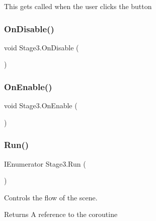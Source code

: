 This gets called when the user clicks the button 

\mbox{\label{class_stage3_a41463491a3a1b6640d0cc22a19de2dfa}} 
\subsubsection{\texorpdfstring{On\+Disable()}{OnDisable()}}
{\footnotesize\ttfamily void Stage3.\+On\+Disable (\begin{DoxyParamCaption}{ }\end{DoxyParamCaption})\hspace{0.3cm}{\ttfamily [private]}}

\mbox{\label{class_stage3_a52931a93bc0d482e2addeda6f41b7d6c}} 
\subsubsection{\texorpdfstring{On\+Enable()}{OnEnable()}}
{\footnotesize\ttfamily void Stage3.\+On\+Enable (\begin{DoxyParamCaption}{ }\end{DoxyParamCaption})\hspace{0.3cm}{\ttfamily [private]}}

\mbox{\label{class_stage3_a3ebce4adf62b36d8987f00fe73a37a38}} 
\subsubsection{\texorpdfstring{Run()}{Run()}}
{\footnotesize\ttfamily I\+Enumerator Stage3.\+Run (\begin{DoxyParamCaption}{ }\end{DoxyParamCaption})\hspace{0.3cm}{\ttfamily [private]}}



Controls the flow of the scene. 

\begin{DoxyReturn}{Returns}
A reference to the coroutine
\end{DoxyReturn}
\mbox{\label{class_stage3_a2055cf61814f4e7a414bc971c7ab81eb}} 
